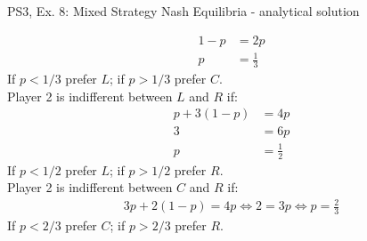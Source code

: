 \begin{frame}{PS3, Ex. 8: Mixed Strategy Nash Equilibria - analytical solution}
\begin{multicols}{2}
\begin{align*}
      1-p     &= 2p \\
      p       &= \frac{1}{3}
    \end{align*}
    If $p<1/3$ prefer $L$; if $p>1/3$ prefer $C$.\\\medskip
    Player 2 is indifferent between $L$ and $R$ if:
    \begin{align*}
      p+3(1-p)&= 4p \\
      3       &= 6p \\
      p       &= \frac{1}{2}
    \end{align*}
    If $p<1/2$ prefer $L$; if $p>1/2$ prefer $R$.\\\medskip
    Player 2 is indifferent between $C$ and $R$ if:
    \begin{align*}
      3p+2(1-p) = 4p \Leftrightarrow 2 = 3p \Leftrightarrow p = \frac{2}{3}
    \end{align*}
    If $p<2/3$ prefer $C$; if $p>2/3$ prefer $R$.\\\medskip
  \vfill\null
  \end{multicols}
\end{frame}
